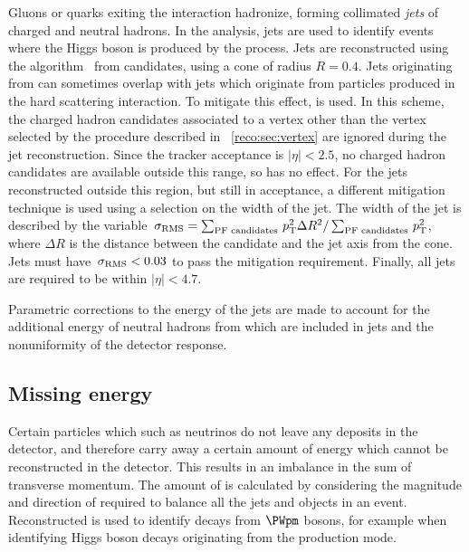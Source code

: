 Gluons or quarks exiting the \pp interaction hadronize, forming collimated \emph{jets} of charged and neutral hadrons.
In the \Hgg analysis, jets are used to identify events where the Higgs boson is produced by the \VBF process. 
Jets are reconstructed using the \antiKt algorithm~\cite{antiKt} from \PF candidates, using a cone of radius $R=0.4$. Jets originating from \PU can sometimes overlap with jets which originate from particles produced in the hard scattering interaction. To mitigate this effect, \PFCHS is used. In this scheme, the \PF charged hadron candidates associated to a vertex other than the vertex selected by the procedure described in \Sec~\ref{reco:sec:vertex} are ignored during the jet reconstruction. %
Since the tracker acceptance is $|\eta|<2.5$, no \PF charged hadron candidates are available outside this range, so \PFCHS has no effect. For the jets reconstructed outside this region, but still in acceptance, a different \PU mitigation technique is used using a selection on the width of the jet. The width of the jet is described by the variable $\,\sigma_{\text{RMS}}= \sum_{\text{PF candidates}}\,p_\text{T}^2 \Delta R^2/ \sum_{\text{PF candidates}}\,p_\text{T}^2  $, where $\Delta R$ is the distance between the \PF candidate and the jet axis from the cone. Jets must have $\,\sigma_{\text{RMS}}<0.03$ to pass the \PU mitigation requirement. Finally, all jets are required to be within  $|\eta|<4.7$.

Parametric corrections to the energy of the jets are made to account for the additional energy of \PF neutral hadrons from \PU which are included in jets and the nonuniformity of the detector response.

\subsection{Missing energy}

Certain particles which such as neutrinos do not leave any deposits in the detector, and therefore carry away a certain amount of energy which cannot be reconstructed in the detector. This results in an imbalance in the sum of transverse momentum. The amount of \MET is calculated by considering the magnitude and direction of \pT required to balance all the jets and \PF objects in an event. Reconstructed \MET is used to identify decays from $\PWpm$ bosons, for example when identifying Higgs boson decays originating from the \WH production mode. 


